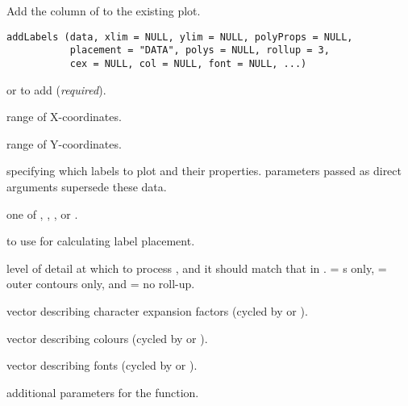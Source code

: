 \documentclass[letterpaper]{book}
\begin{document}
%
\begin{Description}\relax
Add the  column of  to the existing plot.
\end{Description}
%
\begin{Usage}
\begin{verbatim}
addLabels (data, xlim = NULL, ylim = NULL, polyProps = NULL,
           placement = "DATA", polys = NULL, rollup = 3,
           cex = NULL, col = NULL, font = NULL, ...)
\end{verbatim}
\end{Usage}
%
\begin{Arguments}
\begin{ldescription}
\item[\code{data}]  or  to add (\emph{required}).
\item[\code{xlim}] range of X-coordinates.
\item[\code{ylim}] range of Y-coordinates.
\item[\code{polyProps}]  specifying which labels to plot and their
properties.   parameters passed as direct arguments
supersede these data.
\item[\code{placement}] one of , ,
, or .
\item[\code{polys}]  to use for calculating label placement.
\item[\code{rollup}] level of detail at which to process , and it
should match that in .   = s only,
 = outer contours only, and  = no roll-up.
\item[\code{cex}] vector describing character expansion factors (cycled by
 or ).
\item[\code{col}] vector describing colours (cycled by  or
).
\item[\code{font}] vector describing fonts (cycled by  or
).
\item[\code{...}] additional  parameters for the
 function.
\end{ldescription}
\end{Arguments}
%
\end{document}
